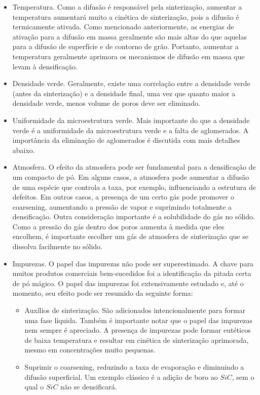 \begin{itemize}
    \item Temperatura. Como a difusão é responsável pela sinterização, aumentar a temperatura aumentará muito a cinética de sinterização, pois a difusão é termicamente ativada. Como mencionado anteriormente, as energias de ativação para a difusão em massa geralmente são mais altas do que aquelas para a difusão de superfície e de contorno de grão. Portanto, aumentar a temperatura geralmente aprimora os mecanismos de difusão em massa que levam à densificação.
    \item Densidade verde. Geralmente, existe uma correlação entre a densidade verde (antes da sinterização) e a densidade final, uma vez que quanto maior a densidade verde, menos volume de poros deve ser eliminado.
    \item Uniformidade da microestrutura verde. Mais importante do que a densidade verde é a uniformidade da microestrutura verde e a falta de aglomerados. A importância da eliminação de aglomerados é discutida com mais detalhes abaixo.
    \item Atmosfera. O efeito da atmosfera pode ser fundamental para a densificação de um compacto de pó. Em alguns casos, a atmosfera pode aumentar a difusão de uma espécie que controla a taxa, por exemplo, influenciando a estrutura de defeitos. Em outros casos, a presença de um certo gás pode promover o coarsening, aumentando a pressão de vapor e suprimindo totalmente a densificação. Outra consideração importante é a solubilidade do gás no sólido. Como a pressão do gás dentro dos poros aumenta à medida que eles encolhem, é importante escolher um gás de atmosfera de sinterização que se dissolva facilmente no sólido.
    \item Impurezas. O papel das impurezas não pode ser superestimado. A chave para muitos produtos comerciais bem-sucedidos foi a identificação da pitada certa de pó mágico. O papel das impurezas foi extensivamente estudado e, até o momento, seu efeito pode ser resumido da seguinte forma:
    \begin{itemize}
        \item Auxílios de sinterização. São adicionados intencionalmente para formar uma fase líquida. Também é importante notar que o papel das impurezas nem sempre é apreciado. A presença de impurezas pode formar eutéticos de baixa temperatura e resultar em cinética de sinterização aprimorada, mesmo em concentrações muito pequenas.
        \item Suprimir o coarsening, reduzindo a taxa de evaporação e diminuindo a difusão superficial. Um exemplo clássico é a adição de boro ao $SiC$, sem o qual o $SiC$ não se densificará.

\end{itemize}
\end{itemize}
